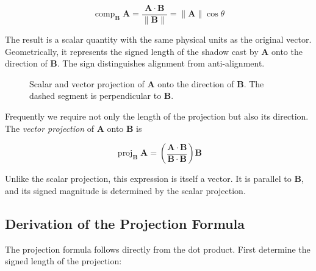 \[
\boxed{
\operatorname{comp}_{\mathbf B}\mathbf A
=
\frac{\mathbf A\cdot\mathbf B}{\lVert\mathbf B\rVert}
=
\lVert\mathbf A\rVert\cos\theta
}
\]

The result is a scalar quantity with the same physical units as the original
vector. Geometrically, it represents the signed length of the shadow cast by
$\mathbf A$ onto the direction of $\mathbf B$. The sign distinguishes alignment
from anti-alignment.

\begin{figure}[htbp]
\centering
\begingroup

\endgroup
\caption{Scalar and vector projection of $\mathbf A$ onto the direction of
$\mathbf B$. The dashed segment is perpendicular to $\mathbf B$.}
\label{fig:vector-projection}
\end{figure}


Frequently we require not only the length of the projection but also its
direction. The \emph{vector projection} of $\mathbf A$ onto $\mathbf B$ is

\[
\boxed{
\operatorname{proj}_{\mathbf B}\mathbf A
=
\left(
\frac{\mathbf A\cdot\mathbf B}{\mathbf B\cdot\mathbf B}
\right)\mathbf B
}
\]

Unlike the scalar projection, this expression is itself a vector. It is parallel
to $\mathbf B$, and its signed magnitude is determined by the scalar projection.

\subsection{Derivation of the Projection Formula}

The projection formula follows directly from the dot product. First determine
the signed length of the projection:

